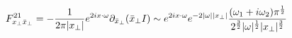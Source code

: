 \begin{equation}
F_{x_\perp \bar x_\perp}^{21}=- 
\frac{1}{2\pi |x_\perp|}
e^{2ix\cdot\omega}\partial_{\bar x_\perp}(\bar x_\perp I)
\sim e^{2ix\cdot \omega}
e^{-2|\omega||x_\perp|}
{(\omega_1+i\omega_2)\pi^{{1\over2}}\over
{2^{{3\over2}}|\omega|^{{1\over2}}|x_\perp|^{{3\over2}}}}
\end{equation}


